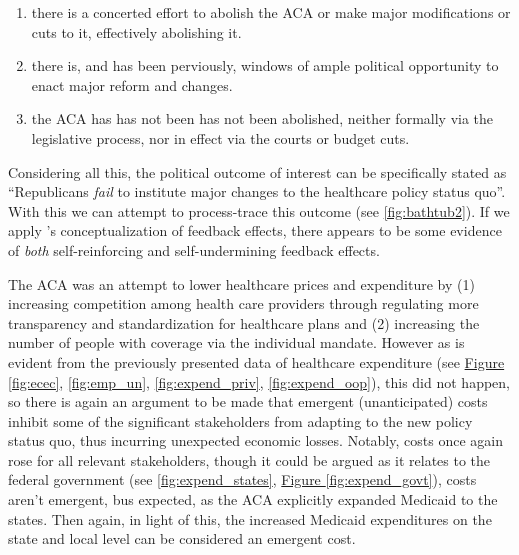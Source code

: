 \documentclass[11pt]{article}
\begin{document}
\begin{enumerate}[label={(\arabic*) ...}]
  \item there is a concerted effort to abolish the ACA or make major modifications or cuts to it, effectively abolishing it.
  \item there is, and has been perviously, windows of ample political opportunity to enact major reform and changes.
  \item the ACA has has not been has not been abolished, neither formally via the legislative process, nor in effect via the courts \parencite[][]{Liu2021} or budget cuts.
\end{enumerate}

Considering all this, the political outcome of interest can be specifically stated as \enquote{Republicans \textit{fail} to institute major changes to the healthcare policy status quo}. With this we can attempt to process-trace this outcome (see \hyperref[fig:bathtub2]{\ref*{fig:bathtub2}}). If we apply \citeauthor[][]{Busemeyer2019}'s \parencite*{Busemeyer2019} conceptualization of feedback effects, there appears to be some evidence of \textit{both} self-reinforcing and self-undermining feedback effects.

The ACA was an attempt to lower healthcare prices and expenditure by (1) increasing competition among health care providers through regulating more transparency and standardization for healthcare plans and (2) increasing the number of people with coverage via the individual mandate. However as is evident from the previously presented data of healthcare expenditure (see \hyperref[fig:ecec]{Figure \ref*{fig:ecec}}, \hyperref[fig:ecec]{\ref*{fig:emp_un}}, \hyperref[fig:expend_priv]{\ref*{fig:expend_priv}}, \hyperref[fig:expend_oop]{\ref*{fig:expend_oop}}), this did not happen, so there is again an argument to be made that emergent (unanticipated) costs inhibit some of the significant stakeholders from adapting to the new policy status quo, thus incurring unexpected economic losses. Notably, costs once again rose for all relevant stakeholders, though it could be argued as it relates to the federal government (see \hyperref[fig:expend_states]{\ref*{fig:expend_states}}, \hyperref[fig:expend_govt]{Figure \ref*{fig:expend_govt}}), costs aren't emergent, bus expected, as the ACA explicitly expanded Medicaid to the states. Then again, in light of this, the increased Medicaid expenditures on the state and local level can be considered an emergent cost.
\end{document}
